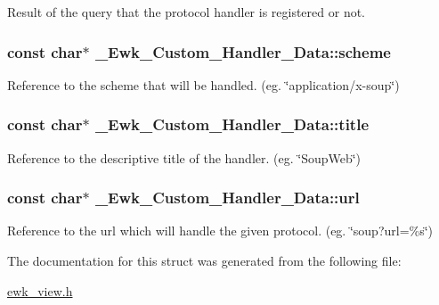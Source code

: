 Result of the query that the protocol handler is registered or not. \hypertarget{struct__Ewk__Custom__Handler__Data_aa4f0a79fda24ef6298239c64026809ef}{
\subsubsection[{scheme}]{\setlength{\rightskip}{0pt plus 5cm}const char$\ast$ \+\_\+\+Ewk\+\_\+\+Custom\+\_\+\+Handler\+\_\+\+Data\+::scheme}}\label{struct__Ewk__Custom__Handler__Data_aa4f0a79fda24ef6298239c64026809ef}
Reference to the scheme that will be handled. (eg. \char`\"{}application/x-\/soup\char`\"{}) \hypertarget{struct__Ewk__Custom__Handler__Data_a9a2966626116e34f7bce20375a3a11c0}{
\subsubsection[{title}]{\setlength{\rightskip}{0pt plus 5cm}const char$\ast$ \+\_\+\+Ewk\+\_\+\+Custom\+\_\+\+Handler\+\_\+\+Data\+::title}}\label{struct__Ewk__Custom__Handler__Data_a9a2966626116e34f7bce20375a3a11c0}
Reference to the descriptive title of the handler. (eg. \char`\"{}\+Soup\+Web\char`\"{}) \hypertarget{struct__Ewk__Custom__Handler__Data_a23d9bedd5c649538d1be8a5f40816ba9}{
\subsubsection[{url}]{\setlength{\rightskip}{0pt plus 5cm}const char$\ast$ \+\_\+\+Ewk\+\_\+\+Custom\+\_\+\+Handler\+\_\+\+Data\+::url}}\label{struct__Ewk__Custom__Handler__Data_a23d9bedd5c649538d1be8a5f40816ba9}
Reference to the url which will handle the given protocol. (eg. \char`\"{}soup?url=\%s\char`\"{}) 

The documentation for this struct was generated from the following file\+:\begin{DoxyCompactItemize}
\item 
\hyperlink{ewk__view_8h}{ewk\+\_\+view.\+h}\end{DoxyCompactItemize}
